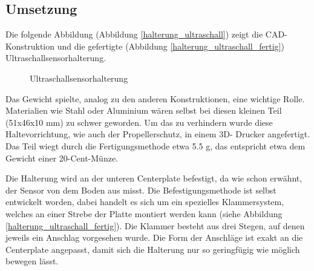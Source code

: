 	\subsection{Umsetzung}

	Die folgende Abbildung (Abbildung \ref{halterung_ultraschall}) zeigt die CAD-Konstruktion und die gefertigte (Abbildung \ref{halterung_ultraschall_fertig}) Ultraschallsensorhalterung.

			\begin{figure}[H]
				\begin{centering}
				\par\end{centering}
				\caption{Ultraschallsensorhalterung}
				\label{Halterung_Ultraschallsensor}
			\end{figure}

	Das Gewicht spielte, analog zu den anderen Konstruktionen, eine wichtige Rolle.
	Materialien wie Stahl oder Aluminium wären selbst bei diesen kleinen Teil (51x46x10 mm) zu schwer geworden.
	Um das zu verhindern wurde diese Haltevorrichtung, wie auch der Propellerschutz, in einem 3D- Drucker angefertigt.
	Das Teil wiegt durch die Fertigungsmethode etwa 5.5 g, das entspricht etwa dem Gewicht einer 20-Cent-Münze.

			\newpage

	Die Halterung wird an der unteren Centerplate befestigt, da wie schon erwähnt, der Sensor von dem Boden aus misst.
	Die Befestigungsmethode ist selbst entwickelt worden, dabei handelt es sich um ein spezielles Klammersystem, welches an einer Strebe der Platte montiert werden kann (siehe Abbildung \ref{halterung_ultraschall_fertig}).
	Die Klammer besteht aus drei Stegen, auf denen jeweils ein Anschlag vorgesehen wurde.
	Die Form der Anschläge ist  exakt an die Centerplate angepasst, damit sich die Halterung nur so geringfügig wie möglich bewegen lässt.

